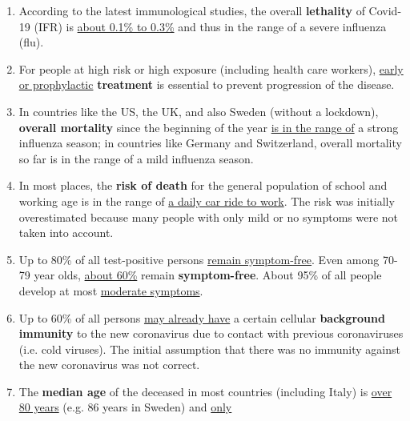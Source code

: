 \begin{enumerate}
\def\labelenumi{\arabic{enumi}.}
\tightlist
\item
  According to the latest immunological studies, the overall
  \textbf{lethality} of Covid-19 (IFR) is
  \href{https://swprs.org/studies-on-covid-19-lethality/}{about 0.1\% to
  0.3\%} and thus in the range of a severe influenza (flu).
\item
  For people at high risk or high exposure (including health care
  workers), \href{https://swprs.org/on-the-treatment-of-covid-19/}{early
  or prophylactic} \textbf{treatment} is essential to prevent
  progression of the disease.
\item
  In countries like the US, the UK, and also Sweden (without a
  lockdown), \textbf{overall mortality} since the beginning of the year
  \href{https://swprs.org/studies-on-covid-19-lethality/\#overall-mortality}{is
  in the range of} a strong influenza season; in countries like Germany
  and Switzerland, overall mortality so far is in the range of a mild
  influenza season.
\item
  In most places, the \textbf{risk of death} for the general population
  of school and working age is in the range of
  \href{https://www.medrxiv.org/content/10.1101/2020.04.05.20054361v1}{a
  daily car ride to work}. The risk was initially overestimated because
  many people with only mild or no symptoms were not taken into account.
\item
  Up to 80\% of all test-positive persons
  \href{https://www.bmj.com/content/369/bmj.m1375}{remain symptom-free}.
  Even among 70-79 year olds,
  \href{https://www.niid.go.jp/niid/en/2019-ncov-e/9407-covid-dp-fe-01.html}{about
  60\%} remain \textbf{symptom-free}. About 95\% of all people develop
  at most
  \href{https://swprs.org/studies-on-covid-19-lethality/\#hospitalizations}{moderate
  symptoms}.
\item
  Up to 60\% of all persons
  \href{https://www.cell.com/cell/fulltext/S0092-8674(20)30610-3}{may
  already have} a certain cellular \textbf{background immunity} to the
  new coronavirus due to contact with previous coronaviruses (i.e. cold
  viruses). The initial assumption that there was no immunity against
  the new coronavirus was not correct.
\item
  The \textbf{median age} of the deceased in most countries (including
  Italy) is
  \href{https://swprs.org/studies-on-covid-19-lethality/\#age}{over 80
  years} (e.g. 86 years in Sweden) and
  \href{https://www.bloomberg.com/news/articles/2020-05-26/italy-says-96-of-virus-fatalities-suffered-from-other-illnesses}{only
}
\end{enumerate}
